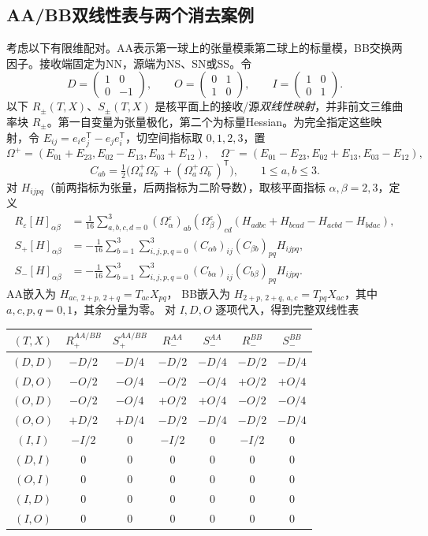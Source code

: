 \documentclass[UTF8,a4paper,11pt,fontset=fandol]{ctexart}
\numberwithin{equation}{section}
\theoremstyle{definition}
\begin{document}
\subsection{AA/BB双线性表与两个消去案例}\label{sec:chiralitytable}
考虑以下有限维配对。AA表示第一球上的张量模乘第二球上的标量模，BB交换两因子。接收端固定为NN，源端为NS、SN或SS。令
\[
D=\begin{pmatrix}1&0\\0&-1\end{pmatrix},\qquad
O=\begin{pmatrix}0&1\\1&0\end{pmatrix},\qquad
I=\begin{pmatrix}1&0\\0&1\end{pmatrix}.
\]
以下 $R_\pm(T,X)$、$S_\pm(T,X)$ 是核平面上的接收/源\emph{双线性映射}，并非前文三维曲率块 $R_\pm$。第一自变量为张量极化，第二个为标量Hessian。为完全指定这些映射，令 $E_{ij}=e_i e_j^{\mathsf T}-e_j e_i^{\mathsf T}$，切空间指标取 $0,1,2,3$，置
\[
\Omega^+=(E_{01}+E_{23},E_{02}-E_{13},E_{03}+E_{12}),\quad
\Omega^-=(E_{01}-E_{23},E_{02}+E_{13},E_{03}-E_{12}),
\]
\[
C_{ab}=\tfrac12\bigl(\Omega_a^+\Omega_b^-+
(\Omega_a^+\Omega_b^-)^{\mathsf T}\bigr),\qquad 1\le a,b\le3.
\]
对 $H_{ijpq}$（前两指标为张量，后两指标为二阶导数），取核平面指标 $\alpha,\beta=2,3$，定义
\begin{align*}
R_\varepsilon[H]_{\alpha\beta}
&=\frac1{16}\sum_{a,b,c,d=0}^3
(\Omega_\alpha^\varepsilon)_{ab}(\Omega_\beta^\varepsilon)_{cd}
(H_{adbc}+H_{bcad}-H_{acbd}-H_{bdac}),\\
S_+[H]_{\alpha\beta}
&=-\frac1{16}\sum_{b=1}^3\sum_{i,j,p,q=0}^3
(C_{\alpha b})_{ij}(C_{\beta b})_{pq}H_{ijpq},\\
S_-[H]_{\alpha\beta}
&=-\frac1{16}\sum_{b=1}^3\sum_{i,j,p,q=0}^3
(C_{b\alpha})_{ij}(C_{b\beta})_{pq}H_{ijpq}.
\end{align*}
AA嵌入为 $H_{ac,\,2+p,\,2+q}=T_{ac}X_{pq}$，
BB嵌入为 $H_{2+p,\,2+q,\,a,c}=T_{pq}X_{ac}$，其中 $a,c,p,q=0,1$，其余分量为零。
对 $I,D,O$ 逐项代入，得到完整双线性表
\begin{center}
\small
\begin{tabular}{c c c c c c c}
\toprule
$(T,X)$ & $R_+^{AA/BB}$ & $S_+^{AA/BB}$ & $R_-^{AA}$ & $S_-^{AA}$ & $R_-^{BB}$ & $S_-^{BB}$\\\midrule
$(D,D)$ & $-D/2$ & $-D/4$ & $-D/2$ & $-D/4$ & $-D/2$ & $-D/4$\\
$(D,O)$ & $-O/2$ & $-O/4$ & $-O/2$ & $-O/4$ & $+O/2$ & $+O/4$\\
$(O,D)$ & $-O/2$ & $-O/4$ & $+O/2$ & $+O/4$ & $-O/2$ & $-O/4$\\
$(O,O)$ & $+D/2$ & $+D/4$ & $-D/2$ & $-D/4$ & $-D/2$ & $-D/4$\\
$(I,I)$ & $-I/2$ & $0$ & $-I/2$ & $0$ & $-I/2$ & $0$\\
$(D,I)$ & $0$ & $0$ & $0$ & $0$ & $0$ & $0$\\
$(O,I)$ & $0$ & $0$ & $0$ & $0$ & $0$ & $0$\\
$(I,D)$ & $0$ & $0$ & $0$ & $0$ & $0$ & $0$\\
$(I,O)$ & $0$ & $0$ & $0$ & $0$ & $0$ & $0$\\\bottomrule
\end{tabular}
\end{center}
\end{document}
